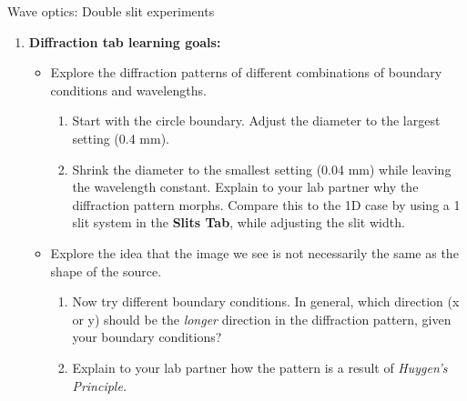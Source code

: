\documentclass{beamer}
\begin{document}
\begin{frame}{Wave optics: Double slit experiments}
\footnotesize
\begin{enumerate}
\item \textbf{Diffraction tab learning goals:}
\begin{itemize}
\footnotesize
\item Explore the diffraction patterns of different combinations of boundary conditions and wavelengths.
\begin{enumerate}
\item Start with the circle boundary.  Adjust the diameter to the largest setting (0.4 mm).
\item Shrink the diameter to the smallest setting (0.04 mm) while leaving the wavelength constant.  Explain to your lab partner why the diffraction pattern morphs.  Compare this to the 1D case by using a 1 slit system in the \textbf{Slits Tab}, while adjusting the slit width.
\end{enumerate}
\item Explore the idea that the image we see is not necessarily the same as the shape of the source.
\begin{enumerate}
\item Now try different boundary conditions. In general, which direction (x or y) should be the \textit{longer} direction in the diffraction pattern, given your boundary conditions?
\item Explain to your lab partner how the pattern is a result of \textit{Huygen's Principle.}
\end{enumerate}
\end{itemize}
\end{enumerate}
\end{frame}
\end{document}
